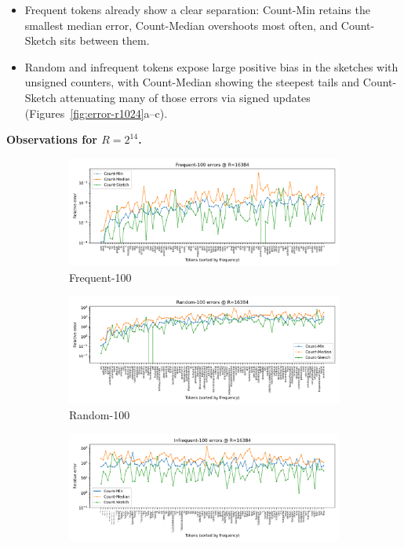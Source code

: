 \documentclass[11pt]{article}
\begin{document}
\begin{itemize}
  \item Frequent tokens already show a clear separation: Count-Min retains the smallest median error, Count-Median overshoots most often, and Count-Sketch sits between them.
  \item Random and infrequent tokens expose large positive bias in the sketches with unsigned counters, with Count-Median showing the steepest tails and Count-Sketch attenuating many of those errors via signed updates (Figures~\ref{fig:error-r1024}a--c).
\end{itemize}

\noindent\textbf{Observations for $R=2^{14}$.}

\begin{figure}[H]
  \centering
  \begin{subfigure}[t]{0.32\linewidth}
    \centering
    \includegraphics[width=\linewidth]{../outputs/a2/errors_R16384_Frequent_100.png}
    \caption{Frequent-100}
  \end{subfigure}
  \hfill
  \begin{subfigure}[t]{0.32\linewidth}
    \centering
    \includegraphics[width=\linewidth]{../outputs/a2/errors_R16384_Random_100.png}
    \caption{Random-100}
  \end{subfigure}
  \hfill
  \begin{subfigure}[t]{0.32\linewidth}
    \centering
    \includegraphics[width=\linewidth]{../outputs/a2/errors_R16384_Infrequent_100.png}

\end{subfigure}
\end{figure}
\end{document}
